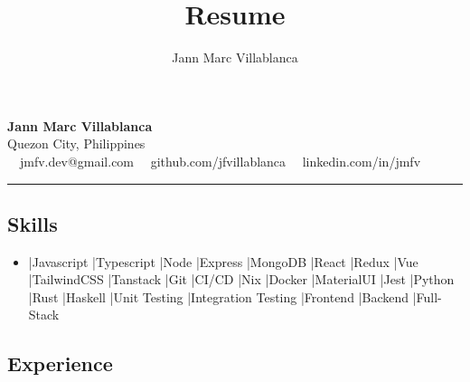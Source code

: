 \documentclass[11pt,letterpaper]{article}
\author{Jann Marc Villablanca}
\title{Resume}
\newenvironment{pipeseparateditemize}[1][]{
    \begin{itemize}[label={}, #1]
        \item
    \def\separator{}
    \def\item{\ifhmode \unskip\space|\space\fi\relax\ignorespaces\separator}
}{%
    \end{itemize}
}
\begin{document}
\begin{center}
	{\LARGE \textbf{Jann Marc Villablanca}}\\
	Quezon City, Philippines
	\vspace{0.05cm}
	\\
	\raisebox{-0.2\height}{\Large \faEnvelopeSquare} \ \ jmfv.dev@gmail.com \hfill \raisebox{-0.2\height}{\Large \faGithubSquare} \ \ github.com/jfvillablanca \hfill \raisebox{-0.2\height}{\Large \faLinkedinSquare} \ \ linkedin.com/in/jmfv
\end{center}

\hrule
\vspace{-1em}
\subsection*{\Large Skills}

\begin{pipeseparateditemize}[leftmargin=1em,noitemsep]
    \item Javascript
    \item Typescript
    \item Node
    \item Express
    \item MongoDB
    \item React
    \item Redux
    \item Vue
    \item TailwindCSS
    \item Tanstack
    \item Git
    \item CI/CD
    \item Nix
    \item Docker
    \item MaterialUI
    \item Jest
    \item Python
    \item Rust
    \item Haskell
    \item Unit Testing
    \item Integration Testing
    \item Frontend
    \item Backend
    \item Full-Stack
\end{pipeseparateditemize}

\vspace{-2em}
\subsection*{\Large Experience}
\end{document}
